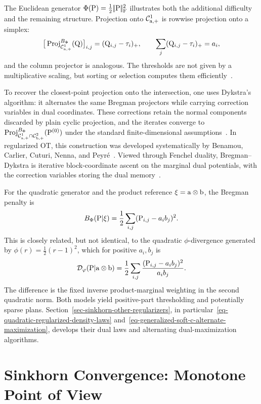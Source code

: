 The Euclidean generator $\Phi(\P)=\frac12\norm{\P}_{\mathrm F}^2$ illustrates both the additional difficulty and the remaining structure. Projection onto $\Cc^1_{\a,+}$ is rowwise projection onto a simplex:
\[
	\big[\Proj_{\Cc^1_{\a,+}}^{B_\Phi}(\Q)\big]_{i,j}
	=
	(\Q_{i,j}-\tau_i)_+,
	\qquad
	\sum_j(\Q_{i,j}-\tau_i)_+=a_i,
\]
and the column projector is analogous. The thresholds are not given by a multiplicative scaling, but sorting or selection computes them efficiently~\cite{blondel2018smooth}.

To recover the closest-point projection onto the intersection, one uses Dykstra's algorithm: it alternates the same Bregman projectors while carrying correction variables in dual coordinates. These corrections retain the normal components discarded by plain cyclic projection, and the iterates converge to $\Proj_{\Cc^1_{\a,+}\cap\Cc^2_{\b,+}}^{B_\Phi}(\P^{(0)})$ under the standard finite-dimensional assumptions~\cite{Dykstra85,CensorReich-Dykstra,bauschke-lewis}. In regularized OT, this construction was developed systematically by Benamou, Carlier, Cuturi, Nenna, and Peyr\'e~\cite{2015-benamou-cisc}. Viewed through Fenchel duality, Bregman--Dykstra is iterative block-coordinate ascent on the marginal dual potentials, with the correction variables storing the dual memory~\cite{BregmanCensorReich1999Dykstra}.

For the quadratic generator and the product reference $\xi=\a\otimes\b$, the Bregman penalty is
\[
	B_\Phi(\P|\xi)
	=
	\frac12\sum_{i,j}(\P_{i,j}-a_i b_j)^2.
\]
This is closely related, but not identical, to the quadratic $\phi$-divergence generated by $\phi(r)=\frac12(r-1)^2$, which for positive $a_i,b_j$ is
\[
	\Divergm_\phi(\P|\a\otimes\b)
	=
	\frac12\sum_{i,j}\frac{(\P_{i,j}-a_i b_j)^2}{a_i b_j}.
\]
The difference is the fixed inverse product-marginal weighting in the second quadratic norm. Both models yield positive-part thresholding and potentially sparse plans. Section~\ref{sec-sinkhorn-other-regularizers}, in particular~\eqref{eq-quadratic-regularized-density-laws} and~\eqref{eq-generalized-soft-c-alternate-maximization}, develops their dual laws and alternating dual-maximization algorithms.

\section{Sinkhorn Convergence: Monotone Point of View}\label{sec-sinkhorn-monotone}

